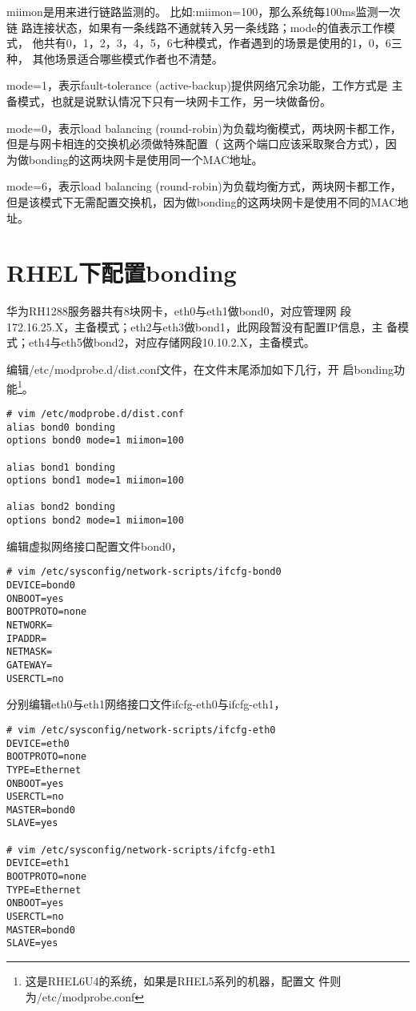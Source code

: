 miimon是用来进行链路监测的。 比如:miimon=100，那么系统每100ms监测一次链
路连接状态，如果有一条线路不通就转入另一条线路；mode的值表示工作模式，
他共有0，1，2，3，4，5，6七种模式，作者遇到的场景是使用的1，0，6三种，
其他场景适合哪些模式作者也不清楚。
 
mode=1，表示fault-tolerance (active-backup)提供网络冗余功能，工作方式是
主备模式，也就是说默认情况下只有一块网卡工作，另一块做备份。
 
mode=0，表示load balancing (round-robin)为负载均衡模式，两块网卡都工作，
但是与网卡相连的交换机必须做特殊配置（ 这两个端口应该采取聚合方式），因
为做bonding的这两块网卡是使用同一个MAC地址。
 
mode=6，表示load balancing (round-robin)为负载均衡方式，两块网卡都工作，
但是该模式下无需配置交换机，因为做bonding的这两块网卡是使用不同的MAC地
址。
 
\section{RHEL下配置bonding}

华为RH1288服务器共有8块网卡，eth0与eth1做bond0，对应管理网
段172.16.25.X，主备模式；eth2与eth3做bond1，此网段暂没有配置IP信息，主
备模式；eth4与eth5做bond2，对应存储网段10.10.2.X，主备模式。

编辑/etc/modprobe.d/dist.conf文件，在文件末尾添加如下几行，开
启bonding功能\footnote{这是RHEL6U4的系统，如果是RHEL5系列的机器，配置文
  件则为/etc/modprobe.conf}。

\begin{verbatim}
# vim /etc/modprobe.d/dist.conf
alias bond0 bonding
options bond0 mode=1 miimon=100

alias bond1 bonding
options bond1 mode=1 miimon=100

alias bond2 bonding
options bond2 mode=1 miimon=100
\end{verbatim}

编辑虚拟网络接口配置文件bond0，

\begin{verbatim}
# vim /etc/sysconfig/network-scripts/ifcfg-bond0
DEVICE=bond0
ONBOOT=yes
BOOTPROTO=none
NETWORK=
IPADDR=
NETMASK=
GATEWAY=
USERCTL=no
\end{verbatim}

分别编辑eth0与eth1网络接口文件ifcfg-eth0与ifcfg-eth1，

\begin{verbatim}
# vim /etc/sysconfig/network-scripts/ifcfg-eth0
DEVICE=eth0
BOOTPROTO=none
TYPE=Ethernet
ONBOOT=yes
USERCTL=no
MASTER=bond0 
SLAVE=yes

# vim /etc/sysconfig/network-scripts/ifcfg-eth1
DEVICE=eth1
BOOTPROTO=none
TYPE=Ethernet
ONBOOT=yes
USERCTL=no
MASTER=bond0 
SLAVE=yes
\end{verbatim}

